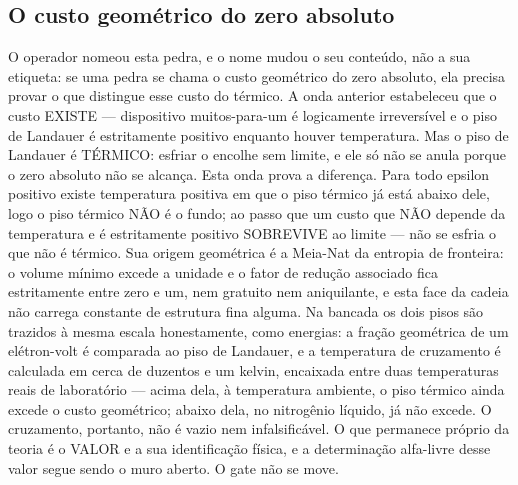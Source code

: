\documentclass[11pt]{article}
\theoremstyle{definition}\newtheorem{deriv}{Derivação}
\begin{document}
\subsection*{O custo geom\'etrico do zero absoluto}O operador nomeou esta pedra, e o nome mudou o seu conte\'udo, n\~ao a sua etiqueta: se uma pedra se chama o custo geom\'etrico do zero absoluto, ela precisa provar o que distingue esse custo do t\'ermico. A onda anterior estabeleceu que o custo EXISTE --- dispositivo muitos-para-um \'e logicamente irrevers\'ivel e o piso de Landauer \'e estritamente positivo enquanto houver temperatura. Mas o piso de Landauer \'e T\'ERMICO: esfriar o encolhe sem limite, e ele s\'o n\~ao se anula porque o zero absoluto n\~ao se alcan\c{c}a. Esta onda prova a diferen\c{c}a. Para todo epsilon positivo existe temperatura positiva em que o piso t\'ermico j\'a est\'a abaixo dele, logo o piso t\'ermico N\~AO \'e o fundo; ao passo que um custo que N\~AO depende da temperatura e \'e estritamente positivo SOBREVIVE ao limite --- n\~ao se esfria o que n\~ao \'e t\'ermico. Sua origem geom\'etrica \'e a Meia-Nat da entropia de fronteira: o volume m\'inimo excede a unidade e o fator de redu\c{c}\~ao associado fica estritamente entre zero e um, nem gratuito nem aniquilante, e esta face da cadeia n\~ao carrega constante de estrutura fina alguma. Na bancada os dois pisos s\~ao trazidos \`a mesma escala honestamente, como energias: a fra\c{c}\~ao geom\'etrica de um el\'etron-volt \'e comparada ao piso de Landauer, e a temperatura de cruzamento \'e calculada em cerca de duzentos e um kelvin, encaixada entre duas temperaturas reais de laborat\'orio --- acima dela, \`a temperatura ambiente, o piso t\'ermico ainda excede o custo geom\'etrico; abaixo dela, no nitrog\^enio l\'iquido, j\'a n\~ao excede. O cruzamento, portanto, n\~ao \'e vazio nem infalsific\'avel. O que permanece pr\'oprio da teoria \'e o VALOR e a sua identifica\c{c}\~ao f\'isica, e a determina\c{c}\~ao alfa-livre desse valor segue sendo o muro aberto. O gate n\~ao se move.
\end{document}
